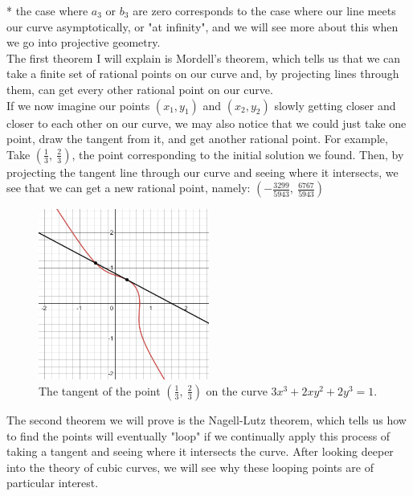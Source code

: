 \documentclass{article}
\begin{document}
* the case where $a_3$ or $b_3$ are zero corresponds to the case where our line meets our curve asymptotically, or "at infinity", and we will see more about this when we go into projective geometry.\\ 

The first theorem I will explain is Mordell's theorem, which tells us that we can take a finite set of rational points on our curve and, by projecting lines through them, can get every other rational point on our curve.\\

If we now imagine our points $(x_1, y_1)$ and $(x_2, y_2)$ slowly getting closer and closer to each other on our curve, we may also notice that we could just take one point, draw the tangent from it, and get another rational point. For example,\\ 

Take $\left( \frac{1}{3}, \  \frac{2}{3}\right)$, the point corresponding to the initial solution we found. Then, by projecting the tangent line through our curve and seeing where it intersects, we see that we can get a new rational point, namely: $\left( - \frac{3299}{5943}, \  \frac{6767}{5943}\right)$\\

\begin{figure}
\centering
\includegraphics[width=0.5\textwidth]{desmos-graph.png}
\caption{\label{fig:into curve} The tangent of the point $\left( \frac{1}{3}, \  \frac{2}{3}\right)$ on the curve $3x^3 + 2xy^2 + 2y^3 = 1$.}
\end{figure}

The second theorem we will prove is the Nagell-Lutz theorem, which tells us how to find the points will eventually "loop" if we continually apply this process of taking a tangent and seeing where it intersects the curve. After looking deeper into the theory of cubic curves, we will see why these looping points are of particular interest.
\end{document}
